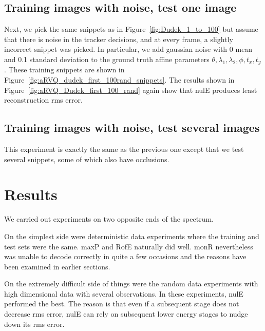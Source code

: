 \subsection{Training images with noise, test one image}
Next, we pick the same snippets as in Figure~\ref{fig:Dudek_1_to_100} but assume that there is noise in the tracker decisions, and at every frame, a slightly incorrect snippet was picked.  In particular, we add gaussian noise with 0 mean and 0.1 standard deviation to the ground truth affine parameters $\theta, \lambda_1, \lambda_2, \phi, t_x, t_y$.  These training snippets are shown in Figure~\ref{fig:aRVQ_dudek_first_100rand_snippets}.  The results shown in Figure~\ref{fig:aRVQ_Dudek_first_100_rand} again show that nulE produces least reconstruction rms error.

\subsection{Training images with noise, test several images}
This experiment is exactly the same as the previous one except that we test several snippets, some of which also have occlusions.

\section{Results}







We carried out experiments on two opposite ends of the spectrum. 

On the simplest side were deterministic data experiments where the training and test sets were the same.  maxP and RofE naturally did well.  monR nevertheless was unable to decode correctly in quite a few occasions and the reasons have been examined in earlier sections.  

On the extremely difficult side of things were the random data experiments with high dimensional data with several observations.  In these experiments, nulE performed the best.  The reason is that even if a subsequent stage does not decrease rms error, nulE can rely on subsequent lower energy stages to nudge down its rms error.  



